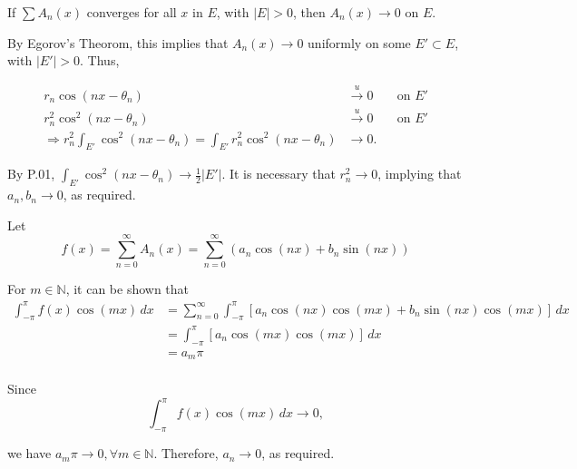 \documentclass[UTF8,a4paper,10pt]{article}
\begin{document}
If $\sum A_n(x)$ converges for all $x$ in $E$, with \(|E|>0\), then  $A_n(x)\to 0$ on \(E\).

By Egorov's Theorom, this implies that \(A_n(x)\to 0\) uniformly on some \(E'\subset E\), with \(|E'|>0\). Thus,

\begin{align*}
  r_n \cos(nx - \theta_n) &\overset{u}{\to} 0 &&\text{on \(E'\)}\\
  r_n^2 \cos^2(nx - \theta_n) &\overset{u}{\to} 0 &&\text{on \(E'\)}\\
  \Rightarrow r_n^2 \int_{E'}  \cos^2(nx - \theta_n) =  \int_{E'} r_n^2 \cos^2(nx - \theta_n) &\to 0.
\end{align*}

By P.01, \(\int_{E'}\cos^2(nx-\theta_n)\to \frac{1}{2}|E'|\). It is necessary that \(r_n^2\to 0\), implying that \(a_n, b_n\to 0\), as required.

\dotfill

Let
\[f(x) = \sum_{n=0}^{\infty}A_n(x) = \sum_{n=0}^{\infty}(a_n \cos (nx) +b_n \sin (nx))\]

For \(m\in \mathbb{N} \), it can be shown that
\begin{align*}
  \int_{-\pi}^{\pi} f(x) \cos(mx) \, dx 
  &= \sum_{n=0}^{\infty}\int_{-\pi}^{\pi}\left[a_n \cos (nx)\cos(mx) + b_n \sin (nx)\cos(mx)\right] \, dx\\
  &= \int_{-\pi}^{\pi}\left[a_n \cos (mx)\cos(mx) \right] \, dx\\
  &= a_m \pi\\
\end{align*}

Since
\[\int_{-\pi}^{\pi} f(x) \cos(mx) \, dx\to 0,\]

we have \(a_m \pi \to 0, \forall m\in \mathbb{N}\). Therefore, \(a_n\to 0\), as required.




\end{document}

